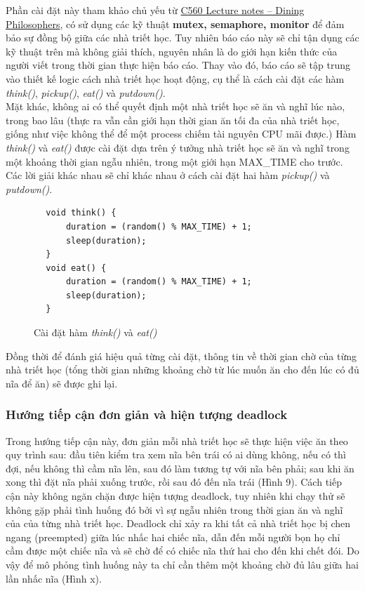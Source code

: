 \documentclass{article}
\begin{document}
Phần cài đặt này tham khảo chủ yếu từ \href{https://web.archive.org/web/20120722014159/http://web.eecs.utk.edu/~plank/plank/classes/cs560/560/notes/Dphil/lecture.html}{C560 Lecture notes -- Dining Philosophers},
có sử dụng các kỹ thuật \textbf{mutex, semaphore, monitor} để đảm bảo sự đồng bộ giữa các nhà triết học. Tuy nhiên báo cáo này sẽ chỉ tận dụng
các kỹ thuật trên mà không giải thích, nguyên nhân là do giới hạn kiến thức của người viết trong thời gian thực hiện báo cáo. Thay vào đó, báo cáo
sẽ tập trung vào thiết kế logic cách nhà triết học hoạt động, cụ thể là cách cài đặt các hàm \textit{think()}, \textit{pickup()},
\textit{eat()} và \textit{putdown()}. \\

Mặt khác, không ai có thể quyết định một nhà triết học sẽ ăn và nghĩ lúc nào, trong bao lâu
(thực ra vẫn cần giới hạn thời gian ăn tối đa của nhà triết học, giống như việc không thể để một process chiếm tài nguyên CPU mãi được.) Hàm
\textit{think()} và \textit{eat()} được cài đặt dựa trên ý tưởng nhà triết học sẽ ăn và nghĩ trong một khoảng thời gian ngẫu nhiên, trong một giới hạn
MAX\_TIME cho trước. Các lời giải khác nhau sẽ chỉ khác nhau ở cách cài đặt hai hàm \textit{pickup()} và \textit{putdown()}.
\begin{shaded}
    \begin{lstlisting}
        void think() {
            duration = (random() % MAX_TIME) + 1;
            sleep(duration);
        }
        void eat() {
            duration = (random() % MAX_TIME) + 1;
            sleep(duration);
        }
    \end{lstlisting}
\end{shaded}

\begin{figure}[h]
    \centering
    \caption{Cài đặt hàm \textit{think()} và \textit{eat()}}
\end{figure}

Đồng thời để đánh giá hiệu quả từng cài đặt, thông tin về thời gian chờ của từng nhà triết học (tổng thời gian những khoảng chờ từ lúc muốn ăn cho đến
lúc có đủ nĩa để ăn) sẽ được ghi lại.
\subsubsection{Hướng tiếp cận đơn giản và hiện tượng deadlock}
Trong hướng tiếp cận này, đơn giản mỗi nhà triết học sẽ thực hiện việc ăn theo quy trình sau: đầu tiên kiểm tra xem nĩa bên trái có ai dùng không, nếu có thì đợi,
nếu không thì cầm nĩa lên, sau đó làm tương tự với nĩa bên phải; sau khi ăn xong thì đặt nĩa phải xuống trước, rồi sau đó đến nĩa trái (Hình 9).
Cách tiếp cận này không ngăn chặn được hiện tượng deadlock, tuy nhiên khi chạy thử sẽ không gặp phải tình huống đó bởi vì sự ngẫu nhiên trong
thời gian ăn và nghĩ của của từng nhà triết học. Deadlock chỉ xảy ra khi tất cả nhà triết học bị chen ngang (preempted) giữa lúc nhấc hai chiếc nĩa,
dẫn đến mỗi người bọn họ chỉ cầm được một chiếc nĩa và sẽ chờ để có chiếc nĩa thứ hai cho đến khi chết đói. Do vậy để mô phỏng tình huống này ta chỉ
cần thêm một khoảng chờ đủ lâu giữa hai lần nhấc nĩa (Hình x).
\end{document}
